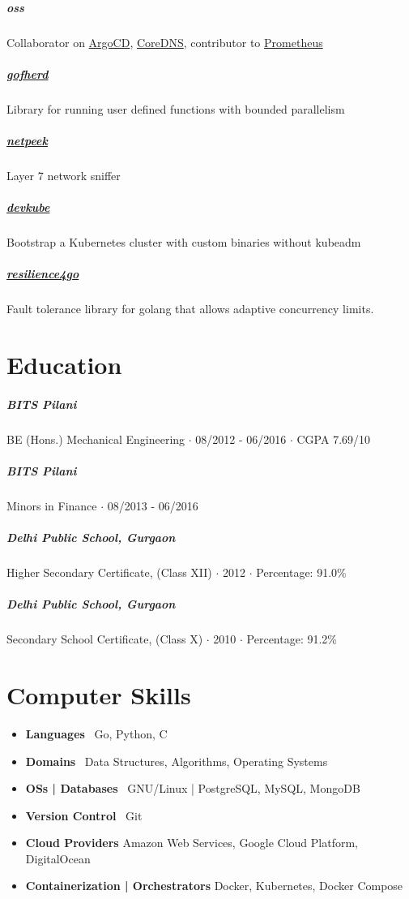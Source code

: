 \documentclass{article}
\begin{document}
\subparagraph{oss}
Collaborator on \href{https://github.com/argoproj/argo-cd/commits?author=darshanime}{ArgoCD}, \href{https://github.com/coredns/coredns/commits?author=darshanime}{CoreDNS}, contributor to \href{https://github.com/prometheus/prometheus/commits?author=darshanime}{Prometheus}

\subparagraph{\href{https://github.com/darshanime/gofherd}{gofherd}}
Library for running user defined functions with bounded parallelism

\subparagraph{\href{https://github.com/darshanime/netpeek}{netpeek}}
Layer 7 network sniffer

\subparagraph{\href{https://github.com/darshanime/devkube}{devkube}}
Bootstrap a Kubernetes cluster with custom binaries without kubeadm

\subparagraph{\href{https://github.com/darshanime/resilience4go}{resilience4go}}
Fault tolerance library for golang that allows adaptive concurrency limits.

\section*{Education}

\subparagraph{BITS Pilani}
BE (Hons.) Mechanical Engineering $\cdot$ 08/2012 - 06/2016 $\cdot$ CGPA 7.69/10

\subparagraph{BITS Pilani}
Minors in Finance $\cdot$ 08/2013 - 06/2016

\subparagraph{Delhi Public School, Gurgaon}
Higher Secondary Certificate, (Class XII) $\cdot$ 2012 $\cdot$ Percentage: 91.0\%

\subparagraph{Delhi Public School, Gurgaon}
Secondary School Certificate, (Class X) $\cdot$ 2010 $\cdot$ Percentage: 91.2\%

\section*{Computer Skills}

\begin{itemize}
    \item \textbf{Languages} \ Go, Python, C
    \item \textbf{Domains} \ Data Structures, Algorithms, Operating Systems
    \item \textbf{OSs | Databases} \ GNU/Linux | PostgreSQL, MySQL, MongoDB
    \item \textbf{Version Control} \ Git
    \item \textbf{Cloud Providers} Amazon Web Services, Google Cloud Platform, DigitalOcean
    \item \textbf{Containerization | Orchestrators} Docker, Kubernetes, Docker Compose
\end{itemize}
\end{document}
